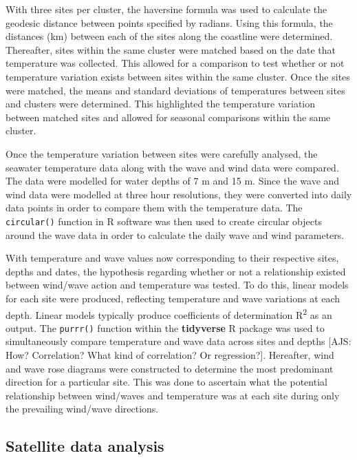 \documentclass[12pt,a4paper,]{article}
\begin{document}
With three sites per cluster, the haversine formula was used to
calculate the geodesic distance between points specified by radians.
Using this formula, the distances (km) between each of the sites along
the coastline were determined. Thereafter, sites within the same cluster
were matched based on the date that temperature was collected. This
allowed for a comparison to test whether or not temperature variation
exists between sites within the same cluster. Once the sites were
matched, the means and standard deviations of temperatures between sites
and clusters were determined. This highlighted the temperature variation
between matched sites and allowed for seasonal comparisons within the
same cluster.

Once the temperature variation between sites were carefully analysed,
the seawater temperature data along with the wave and wind data were
compared. The data were modelled for water depths of 7 m and 15 m. Since
the wave and wind data were modelled at three hour resolutions, they
were converted into daily data points in order to compare them with the
temperature data. The \texttt{circular()} function in R software was
then used to create circular objects around the wave data in order to
calculate the daily wave and wind parameters.

With temperature and wave values now corresponding to their respective
sites, depths and dates, the hypothesis regarding whether or not a
relationship existed between wind/wave action and temperature was
tested. To do this, linear models for each site were produced,
reflecting temperature and wave variations at each depth. Linear models
typically produce coefficients of determination R\textsuperscript{2} as
an output. The \texttt{purrr()} function within the \textbf{tidyverse} R
package was used to simultaneously compare temperature and wave data
across sites and depths {[}AJS: How? Correlation? What kind of
correlation? Or regression?{]}. Hereafter, wind and wave rose diagrams
were constructed to determine the most predominant direction for a
particular site. This was done to ascertain what the potential
relationship between wind/waves and temperature was at each site during
only the prevailing wind/wave directions.

\hypertarget{satellite-data-analysis}{%
\subsection{Satellite data analysis}\label{satellite-data-analysis}}
\end{document}
